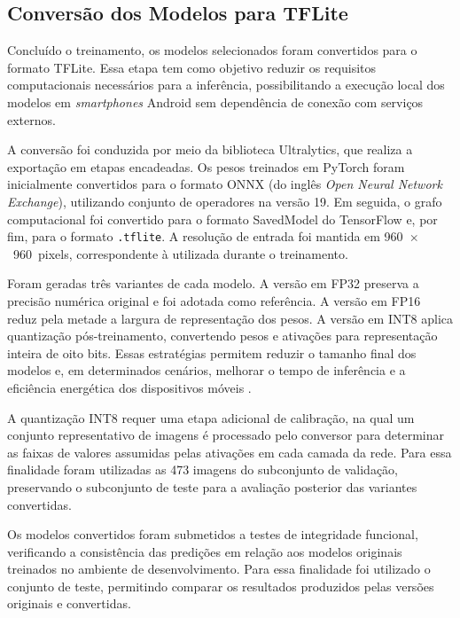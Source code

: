 \documentclass[artigo,times,capa]{iftex2024}
\begin{document}
\subsection{Conversão dos Modelos para TFLite}
\label{sec:conversao_tflite}

Concluído o treinamento, os modelos selecionados foram convertidos para o formato \ac{TFLite}. Essa etapa tem como objetivo reduzir os requisitos computacionais necessários para a inferência, possibilitando a execução local dos modelos em \textit{smartphones} Android sem dependência de conexão com serviços externos.

A conversão foi conduzida por meio da biblioteca Ultralytics, que realiza a exportação em etapas encadeadas. Os pesos treinados em PyTorch foram inicialmente convertidos para o formato ONNX (do inglês \textit{Open Neural Network Exchange}), utilizando conjunto de operadores na versão 19. Em seguida, o grafo computacional foi convertido para o formato SavedModel do TensorFlow e, por fim, para o formato \texttt{.tflite}. A resolução de entrada foi mantida em 960~$\times$~960~pixels, correspondente à utilizada durante o treinamento.

Foram geradas três variantes de cada modelo. A versão em \ac{FP32} preserva a precisão numérica original e foi adotada como referência. A versão em \ac{FP16} reduz pela metade a largura de representação dos pesos. A versão em \ac{INT8} aplica quantização pós-treinamento, convertendo pesos e ativações para representação inteira de oito bits. Essas estratégias permitem reduzir o tamanho final dos modelos e, em determinados cenários, melhorar o tempo de inferência e a eficiência energética dos dispositivos móveis \cite{Menghani2023Efficient}.

A quantização \ac{INT8} requer uma etapa adicional de calibração, na qual um conjunto representativo de imagens é processado pelo conversor para determinar as faixas de valores assumidas pelas ativações em cada camada da rede. Para essa finalidade foram utilizadas as 473 imagens do subconjunto de validação, preservando o subconjunto de teste para a avaliação posterior das variantes convertidas.

Os modelos convertidos foram submetidos a testes de integridade funcional, verificando a consistência das predições em relação aos modelos originais treinados no ambiente de desenvolvimento. Para essa finalidade foi utilizado o conjunto de teste, permitindo comparar os resultados produzidos pelas versões originais e convertidas.
\end{document}
